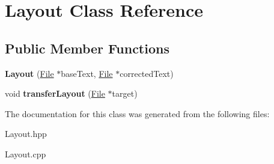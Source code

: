 \hypertarget{classLayout}{}\section{Layout Class Reference}
\label{classLayout}
\subsection*{Public Member Functions}
\begin{DoxyCompactItemize}
\item 
\mbox{\label{classLayout_a668390329ed1b47bb509773c5af6bab4}} 
{\bfseries Layout} (\hyperlink{classFile}{File} $\ast$base\+Text, \hyperlink{classFile}{File} $\ast$corrected\+Text)
\item 
\mbox{\label{classLayout_a3b4a785ff44fa3c68a06a5ba21fe8a3a}} 
void {\bfseries transfer\+Layout} (\hyperlink{classFile}{File} $\ast$target)
\end{DoxyCompactItemize}


The documentation for this class was generated from the following files\+:\begin{DoxyCompactItemize}
\item 
Layout.\+hpp\item 
Layout.\+cpp\end{DoxyCompactItemize}

